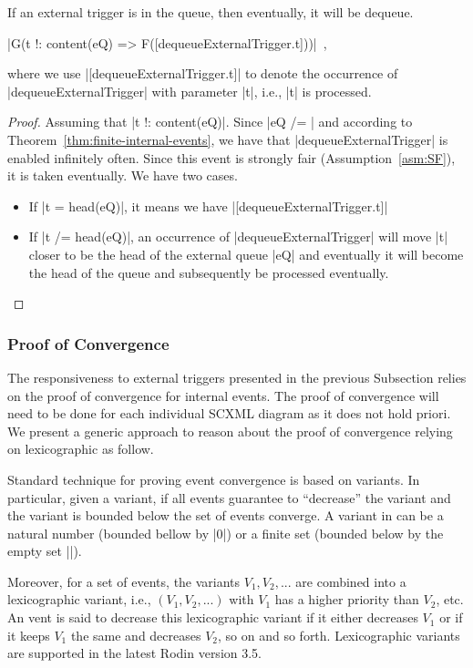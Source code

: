 \begin{theorem}
  If an external trigger is in the queue, then eventually, it will be dequeue.
  \begin{center}
    |G(t !: content(eQ) => F([dequeueExternalTrigger.t]))|~,
  \end{center}
  where we use |[dequeueExternalTrigger.t]| to denote the occurrence of
  |dequeueExternalTrigger| with parameter |t|, i.e., |t| is processed.
\end{theorem}
\begin{proof}
  Assuming that |t !: content(eQ)|. Since |eQ /= {}| and according to
  Theorem~\ref{thm:finite-internal-events}, we have that
  |dequeueExternalTrigger| is enabled infinitely often.  Since this
  event is strongly fair (Assumption~\ref{asm:SF}), it is taken
  eventually. We have two cases.
  \begin{itemize}
  \item If |t = head(eQ)|, it means we have
    |[dequeueExternalTrigger.t]|
    
  \item If |t /= head(eQ)|, an occurrence of |dequeueExternalTrigger|
    will move |t| closer to be the head of the external queue |eQ| and
    eventually it will become the head of the queue and subsequently
    be processed eventually.
  \end{itemize}
\end{proof}

\subsubsection{Proof of Convergence}
\label{sec:proof-convergence}
The responsiveness to external triggers presented in the previous
Subsection relies on the proof of convergence for internal events. The
proof of convergence will need to be done for each individual SCXML
diagram as it does not hold priori.  We present a generic approach to
reason about the proof of convergence relying on lexicographic as
follow.

Standard technique for proving event convergence is based on
variants.  In particular, given a variant, if all events guarantee to
``decrease'' the variant and the variant is bounded below the set of
events converge.  A variant in \EventB can be a natural number
(bounded bellow by |0|) or a finite set (bounded below by the empty
set |{}|).

Moreover, for a set of events, the variants $V_1, V_2, ...$ are combined into a
lexicographic variant, i.e., $(V_1, V_2, ...)$ with $V_1$ has a higher
priority than $V_2$, etc. An vent is said to decrease this
lexicographic variant if it either decreases $V_1$ or if it keeps
$V_1$ the same and decreases $V_2$, so on and so forth.  Lexicographic
variants are supported in the latest Rodin version 3.5.

